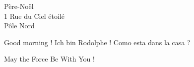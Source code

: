 \documentclass[12pt]{lettre}
\begin{document}
	\begin{letter}{Père-Noël\\
				   1 Rue du Ciel étoilé\\
				   Pôle Nord\\
                  }
      \date{le 30 avril 2017}
      \address{Marcel PATULACCI\\
      		   Rue du Brigadier-Chef\\
			   00000 LA BAVURE}
      \notelephone
      \nofax
	\opening{Good morning ! Ich bin Rodolphe ! Como esta dans la casa ?}
	\lipsum[1-2]
	\closing{May the Force Be With You !}
	\end{letter}
\end{document}
